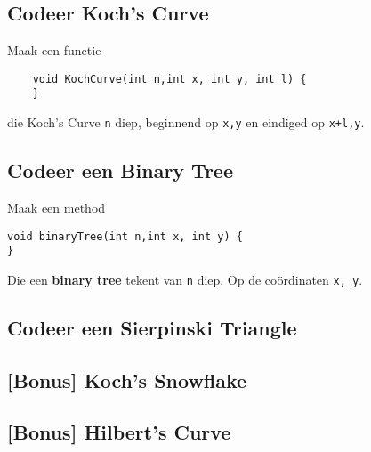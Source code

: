 \subsection{Codeer Koch's Curve}
Maak een functie 
\begin{lstlisting}
    void KochCurve(int n,int x, int y, int l) {
    }
\end{lstlisting}
die Koch's Curve \texttt{n} diep, beginnend op \texttt{x,y} en eindiged op \texttt{x+l,y}.

\subsection{Codeer een Binary Tree}
Maak een method
\begin{lstlisting}
void binaryTree(int n,int x, int y) {
}
\end{lstlisting}
Die een \textbf{binary tree} tekent van \texttt{n} diep. Op de co\"ordinaten \texttt{x, y}.

\subsection{Codeer een Sierpinski Triangle}

\subsection{[Bonus] Koch's Snowflake}

\subsection{[Bonus] Hilbert's Curve}


